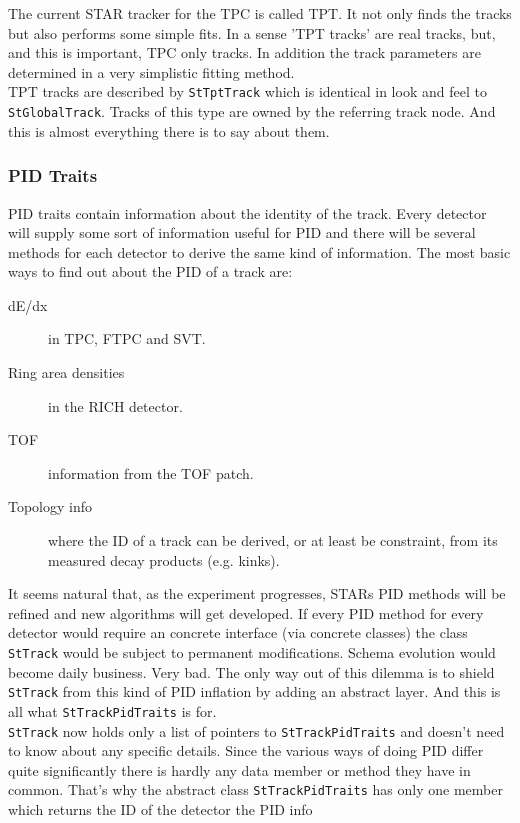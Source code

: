\documentclass[twoside]{article}
\begin{document}
The current STAR tracker for the TPC is called TPT. It not only finds the tracks
but also performs some simple fits. In a sense 'TPT tracks' are real tracks, but,
and this is important, TPC only tracks. In addition the track parameters are determined
in a very simplistic fitting method. \\
TPT tracks are described by \texttt{StTptTrack} which is identical in look and feel to
\texttt{StGlobalTrack}. Tracks of this type are owned by the referring track node.
And this is almost everything there is to say about them.

\subsubsection{PID Traits}
\label{sec:pidTraits}
PID traits contain information about the identity of the track. Every
detector will supply some sort of information useful for PID and there
will be several methods for each detector to derive the same kind of
information. The most basic ways to find out about the PID of a track
are:
\begin{description}
\item[dE/dx] in TPC, FTPC and SVT.
\item[Ring area densities] in the RICH detector.
\item[TOF] information from the TOF patch.
\item[Topology info] where the ID of a track can be derived, or at
    least be constraint, from its measured decay products (e.g.
    kinks).
\end{description}
It seems natural that, as the experiment progresses, STARs PID methods
will be refined and new algorithms will get developed. If every PID
method for every detector would require an concrete interface (via
concrete classes) the class \texttt{StTrack} would be subject to
permanent modifications. Schema evolution would become daily business.
Very bad.  The only way out of this dilemma is to shield
\texttt{StTrack} from this kind of PID inflation by adding
an abstract layer. And this is all what \texttt{StTrackPidTraits} is for.\\
\texttt{StTrack} now holds only a list of pointers to
\texttt{StTrackPidTraits} and doesn't need to know about any specific
details. Since the various ways of doing PID differ quite
significantly there is hardly any data member or method they have in
common.  That's why the abstract class \texttt{StTrackPidTraits} has
only one member which returns the ID of the detector the PID info
\end{document}
